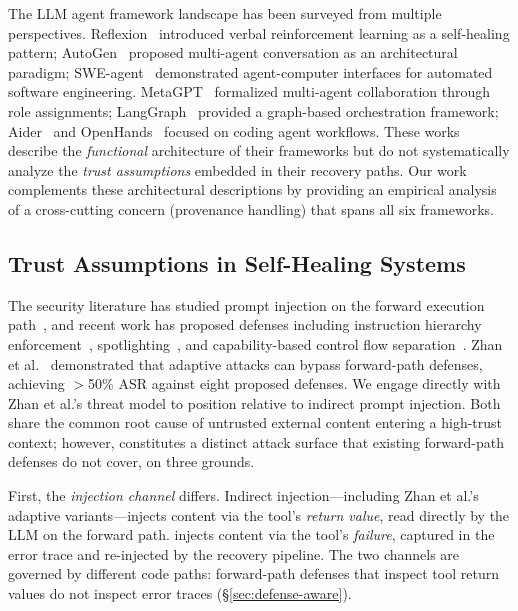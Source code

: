 The LLM agent framework landscape has been surveyed from multiple perspectives. Reflexion~\cite{reflexion} introduced verbal reinforcement learning as a self-healing pattern; AutoGen~\cite{autogen} proposed multi-agent conversation as an architectural paradigm; SWE-agent~\cite{swe-agent} demonstrated agent-computer interfaces for automated software engineering. MetaGPT~\cite{meta-agent} formalized multi-agent collaboration through role assignments; LangGraph~\cite{langgraph} provided a graph-based orchestration framework; Aider~\cite{aider-code} and OpenHands~\cite{openhands-code} focused on coding agent workflows. These works describe the \emph{functional} architecture of their frameworks but do not systematically analyze the \emph{trust assumptions} embedded in their recovery paths. Our work complements these architectural descriptions by providing an empirical analysis of a cross-cutting concern (provenance handling) that spans all six frameworks.

\subsection{Trust Assumptions in Self-Healing Systems}

The security literature has studied prompt injection on the forward execution path~\cite{greshake2023indirect,liu2024formalizing,willison2023prompt}, and recent work has proposed defenses including instruction hierarchy enforcement~\cite{instruction-hierarchy}, spotlighting~\cite{spotlighting}, and capability-based control flow separation~\cite{debenedetti2025camel}. Zhan et al.~\cite{zhan2025adaptive} demonstrated that adaptive attacks can bypass forward-path defenses, achieving $>$50\% ASR against eight proposed defenses. We engage directly with Zhan et al.'s threat model to position \rci{} relative to indirect prompt injection. Both share the common root cause of untrusted external content entering a high-trust context; however, \rci{} constitutes a distinct attack surface that existing forward-path defenses do not cover, on three grounds.

First, the \emph{injection channel} differs. Indirect injection---including Zhan et al.'s adaptive variants---injects content via the tool's \emph{return value}, read directly by the LLM on the forward path. \rci{} injects content via the tool's \emph{failure}, captured in the error trace and re-injected by the recovery pipeline. The two channels are governed by different code paths: forward-path defenses that inspect tool return values do not inspect error traces (\S\ref{sec:defense-aware}).

